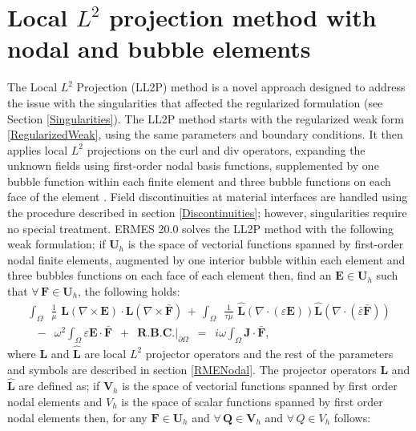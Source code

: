 \section{Local $L^{2}$ projection method with nodal and bubble elements}\label{L2PNodalBubb}

The Local $L^{2}$ Projection (LL2P) method is a novel approach designed to address the issue with the singularities that affected the regularized formulation (see Section \ref{Singularities}). The LL2P method starts with the regularized weak form \eqref{RegularizedWeak}, using the same parameters and boundary conditions. It then applies local $L^{2}$ projections on the curl and div operators, expanding the unknown fields using first-order nodal basis functions, supplemented by one bubble function within each finite element and three bubble functions on each face of the element \cite{L2P-BE, L2P-BE-P}. Field discontinuities at material interfaces are handled using the procedure described in section \ref{Discontinuities}; however, singularities require no special treatment. ERMES 20.0 solves the LL2P method with the following weak formulation; if $\mathbf{U}_{h}$ is the space of vectorial functions spanned by first-order nodal finite elements, augmented by one interior bubble within each element and three bubbles functions on each face of each element then, find an $\mathbf{E} \in \mathbf{U}_{h}$ such that $\forall\,\mathbf{F} \in \mathbf{U}_{h}$, the following holds:
\begin{equation}\label{LL2P-Weak}
	\begin{aligned}
		\int_{\Omega}\enspace\frac{1}{\mu}\,\,\mathbf{L}\left(\nabla\times\mathbf{E}\right)\cdot\mathbf{L}\left(\nabla\times\mathbf{\bar{F}}\right)\, + \,\int_{\Omega}\enspace\frac{1}{\tau\mu}\,\,\mathbf{\hat{L}}\left(\nabla\cdot\left(\varepsilon\mathbf{E}\right)\right)\mathbf{\hat{L}}\left(\nabla\cdot\left(\bar{\varepsilon}\mathbf{\bar{F}}\right)\right)
		\\
		\,\,\,\,-\enspace\omega^{2}\int_{\Omega}\varepsilon\mathbf{E}\cdot\mathbf{\bar{F}}\enspace + \enspace \textbf{R.B.C.}|_{\partial\Omega}\enspace = \enspace i\omega\int_{\Omega}\mathbf{J}\cdot\mathbf{\bar{F}},
	\end{aligned}
\end{equation}
where $\mathbf{L}$ and $\mathbf{\hat{L}}$ are local $L^{2}$ projector operators and the rest of the parameters and symbols are described in section \ref{RMENodal}. The projector operators $\mathbf{L}$ and $\mathbf{\hat{L}}$ are defined as; if $\mathbf{V}_{h}$ is the space of vectorial functions spanned by first order nodal elements and $V_{h}$ is the space of scalar functions spanned by first order nodal elements then, for any $\mathbf{F} \in \mathbf{U}_{h}$ and $\forall\,\mathbf{Q} \in \mathbf{V}_{h}$ and $\forall\,Q \in {V}_{h}$ follows:
